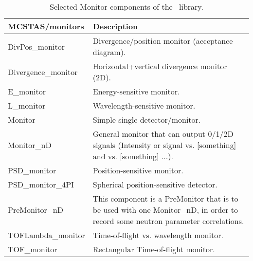 \begin{table}
  \begin{center}
    {\let\my=\\
    \begin{tabular}{|p{}|p{}|}
      \hline
       {\bf MCSTAS/monitors} & Description \\
       \hline
DivPos\_monitor  &    Divergence/position monitor (acceptance diagram). \\
Divergence\_monitor &  Horizontal+vertical
                    divergence monitor (2D). \\
E\_monitor       &    Energy-sensitive monitor. \\
L\_monitor        &  Wavelength-sensitive monitor. \\
Monitor          &   Simple single detector/monitor. \\
Monitor\_nD      &   General monitor that can output
                    0/1/2D signals (Intensity or signal vs. [something]
                    and vs. [something] ...). \\
PSD\_monitor     &    Position-sensitive monitor. \\
PSD\_monitor\_4PI  &   Spherical position-sensitive detector. \\
PreMonitor\_nD    &   This component is a PreMonitor that is to be
                    used with one Monitor\_nD,
                    in order to record some neutron parameter correlations. \\
TOFLambda\_monitor &  Time-of-flight vs. wavelength monitor. \\
TOF\_monitor     &    Rectangular Time-of-flight monitor. \\
      \hline
    \end{tabular}
    \caption{Selected Monitor components of the \MCS\ library.}
    \label{t:comp-monitors}
    }
  \end{center}
\end{table}

